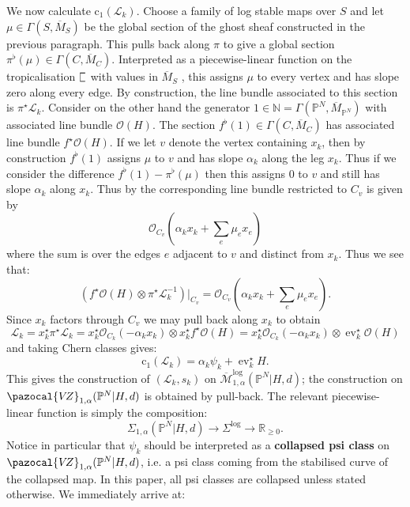 \documentclass[11pt]{amsart}
\newcommand{\sqC}{\scalebox{0.8}[1.3]{$\sqsubset$}}
\newcommand{\MLog}{\overline{\mathcal{M}}^{\operatorname{log}}}
\newcommand{\PP}{\mathbb P}
\newcommand{\VZ}{\pazocal{V\!Z}}
\newcommand{\st}{\star}
\newcommand{\N}{\mathbb{N}}
\newcommand{\OO}{\mathcal{O}}
\renewcommand{\to}{\rightarrow}
\newcommand{\ev}{\operatorname{ev}}
\newcommand{\Lcal}{\mathcal{L}}
\newcommand{\cchern}{\mathrm{c}}
\newcommand{\ol}[1]{\overline{#1}}
\newcommand{\RR}{\mathbb{R}}
\theoremstyle{definition}
\theoremstyle{definition}
\begin{document}
We now calculate $\cchern_1(\Lcal_k)$. Choose a family of log stable maps over $S$ and let $\mu \in \Gamma(S,\ol{M}_S)$ be the global section of the ghost sheaf constructed in the previous paragraph. This pulls back along $\pi$ to give a global section $\pi^\flat(\mu) \in \Gamma(C,\ol{M}_C)$.  Interpreted as a piecewise-linear function on the tropicalisation $\sqC$ with values in $\ol{M}_S$ \cite[Remark 7.3]{CavalieriChanUlirschWise}, this assigns $\mu$ to every vertex and has slope zero along every edge. By construction, the line bundle associated to this section is $\pi^\st \Lcal_k$. Consider on the other hand the generator $1 \in \N = \Gamma(\PP^N,\ol{M}_{\PP^N})$ with associated line bundle $\OO(H)$. The section $f^\flat(1) \in \Gamma(C,\ol{M}_C)$ has associated line bundle $f^\st\OO(H)$. If we let $v$ denote the vertex containing $x_k$, then by construction $f^\flat(1)$ assigns $\mu$ to $v$ and has slope $\alpha_k$ along the leg $x_k$. Thus if we consider the difference $f^\flat(1) - \pi^\flat(\mu)$ then this assigns $0$ to $v$ and still has slope $\alpha_k$ along $x_k$. Thus by \cite[Proposition 2.4.1]{RSPW} the corresponding line bundle restricted to $C_v$ is given by
\begin{equation*} \OO_{C_v} \left(\alpha_k x_k + \sum_e \mu_e x_e \right) \end{equation*}
where the sum is over the edges $e$ adjacent to $v$ and distinct from $x_k$. Thus we see that:
\begin{equation*} \left( f^\st\OO(H) \otimes \pi^\st \Lcal_k^{-1} \right) \big|_{C_v} = \OO_{C_v} \left(\alpha_k x_k + \sum_e \mu_e x_e \right).\end{equation*}
Since $x_k$ factors through $C_v$ we may pull back along $x_k$ to obtain
\begin{equation*} \Lcal_k = x_k^\st\pi^\st \Lcal_k = x_k^\st \OO_{C_k}(-\alpha_k x_k) \otimes x_k^\st f^\st\OO(H) = x_k^\st \OO_{C_k}(-\alpha_k x_k) \otimes \ev_k^\st \OO(H) \end{equation*}
and taking Chern classes gives:
\begin{equation*} \cchern_1(\Lcal_k) = \alpha_k \psi_k + \ev_k^\st H.\end{equation*}
This gives the construction of $(\Lcal_k,s_k)$ on $\MLog_{1,\alpha}(\PP^N|H,d)$; the construction on $\VZ_{1,\alpha}(\PP^N|H,d)$ is obtained by pull-back. The relevant piecewise-linear function is simply the composition:
\begin{equation*} \Sigma_{1,\alpha}(\PP^N|H,d) \to \Sigma^{\log} \to \RR_{\geq 0}.\end{equation*}
Notice in particular that $\psi_k$ should be interpreted as a \textbf{collapsed psi class} on $\VZ_{1,\alpha}(\PP^N|H,d)$, i.e. a psi class coming from the stabilised curve of the collapsed map. In this paper, all psi classes are collapsed unless stated otherwise. We immediately arrive at:
\end{document}
